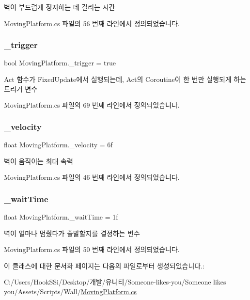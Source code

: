 벽이 부드럽게 정지하는 데 걸리는 시간 



Moving\+Platform.\+cs 파일의 56 번째 라인에서 정의되었습니다.

\mbox{\label{class_moving_platform_a98e69f4b8bfe702ef2bc6a8d77a03b8a}} 
\subsubsection{\texorpdfstring{\_trigger}{\_trigger}}
{\footnotesize\ttfamily bool Moving\+Platform.\+\_\+trigger = true\hspace{0.3cm}{\ttfamily [private]}}



Act 함수가 Fixed\+Update에서 실행되는데, Act의 Coroutine이 한 번만 실행되게 하는 트리거 변수 



Moving\+Platform.\+cs 파일의 69 번째 라인에서 정의되었습니다.

\mbox{\label{class_moving_platform_a831cd24df75aa37f0897741d189686a7}} 
\subsubsection{\texorpdfstring{\_velocity}{\_velocity}}
{\footnotesize\ttfamily float Moving\+Platform.\+\_\+velocity = 6f}



벽이 움직이는 최대 속력 



Moving\+Platform.\+cs 파일의 46 번째 라인에서 정의되었습니다.

\mbox{\label{class_moving_platform_af1a2156a73b89603147dc4009679c738}} 
\subsubsection{\texorpdfstring{\_waitTime}{\_waitTime}}
{\footnotesize\ttfamily float Moving\+Platform.\+\_\+wait\+Time = 1f}



벽이 얼마나 멈췄다가 출발할지를 결정하는 변수 



Moving\+Platform.\+cs 파일의 50 번째 라인에서 정의되었습니다.



이 클래스에 대한 문서화 페이지는 다음의 파일로부터 생성되었습니다.\+:\begin{DoxyCompactItemize}
\item 
C\+:/\+Users/\+Hook\+S\+Si/\+Desktop/개발/유니티/\+Someone-\/likes-\/you/\+Someone likes you/\+Assets/\+Scripts/\+Wall/\mbox{\hyperlink{_moving_platform_8cs}{Moving\+Platform.\+cs}}\end{DoxyCompactItemize}

